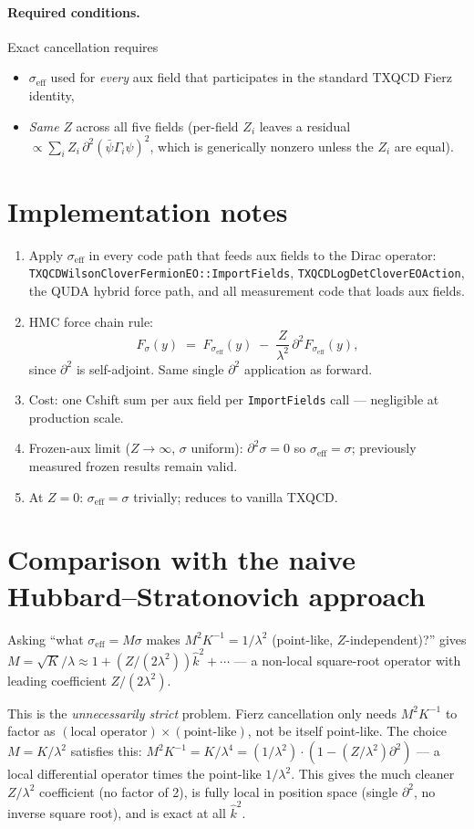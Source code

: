 \documentclass[11pt]{article}
\begin{document}
\paragraph{Required conditions.}  Exact cancellation requires
\begin{itemize}
\item $\sigma_{\text{eff}}$ used for \emph{every} aux field that participates in the standard TXQCD Fierz identity,
\item \emph{Same} $Z$ across all five fields (per-field $Z_i$ leaves a residual $\propto \sum_i Z_i\,\partial^2(\bar\psi\Gamma_i\psi)^2$, which is generically nonzero unless the $Z_i$ are equal).
\end{itemize}

\section*{Implementation notes}

\begin{enumerate}
\item Apply $\sigma_{\text{eff}}$ in every code path that feeds aux fields to the Dirac operator: \texttt{TXQCDWilsonCloverFermionEO::ImportFields}, \texttt{TXQCDLogDetCloverEOAction}, the QUDA hybrid force path, and all measurement code that loads aux fields.
\item HMC force chain rule:
\[
F_\sigma(y) \;=\; F_{\sigma_{\text{eff}}}(y) \;-\; \frac{Z}{\lambda^2}\,\partial^2 F_{\sigma_{\text{eff}}}(y),
\]
since $\partial^2$ is self-adjoint.  Same single $\partial^2$ application as forward.
\item Cost: one Cshift sum per aux field per \texttt{ImportFields} call — negligible at production scale.
\item Frozen-aux limit ($Z\!\to\!\infty$, $\sigma$ uniform): $\partial^2\sigma = 0$ so $\sigma_{\text{eff}} = \sigma$; previously measured frozen results remain valid.
\item At $Z=0$: $\sigma_{\text{eff}} = \sigma$ trivially; reduces to vanilla TXQCD.
\end{enumerate}

\section*{Comparison with the naive Hubbard--Stratonovich approach}

Asking ``what $\sigma_{\text{eff}} = M\sigma$ makes $M^2 K^{-1} = 1/\lambda^2$ (point-like, $Z$-independent)?''  gives $M = \sqrt{K}/\lambda \approx 1 + (Z/(2\lambda^2))\hat k^2 + \cdots$ — a non-local square-root operator with leading coefficient $Z/(2\lambda^2)$.

This is the \emph{unnecessarily strict} problem.  Fierz cancellation only needs $M^2 K^{-1}$ to factor as $(\text{local operator}) \times (\text{point-like})$, not be itself point-like.  The choice $M = K/\lambda^2$ satisfies this: $M^2 K^{-1} = K/\lambda^4 = (1/\lambda^2)\cdot(1 - (Z/\lambda^2)\partial^2)$ — a local differential operator times the point-like $1/\lambda^2$.  This gives the much cleaner $Z/\lambda^2$ coefficient (no factor of 2), is fully local in position space (single $\partial^2$, no inverse square root), and is exact at all $\hat k^2$.
\end{document}
